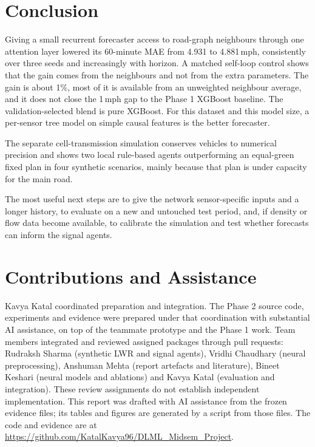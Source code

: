 \documentclass[conference]{IEEEtran}
\begin{document}
\section{Conclusion}
Giving a small recurrent forecaster access to road-graph neighbours through one attention layer lowered its 60-minute MAE from 4.931 to 4.881\,mph, consistently over three seeds and increasingly with horizon. A matched self-loop control shows that the gain comes from the neighbours and not from the extra parameters. The gain is about 1\%, most of it is available from an unweighted neighbour average, and it does not close the 1\,mph gap to the Phase 1 XGBoost baseline. The validation-selected blend is pure XGBoost. For this dataset and this model size, a per-sensor tree model on simple causal features is the better forecaster.

The separate cell-transmission simulation conserves vehicles to numerical precision and shows two local rule-based agents outperforming an equal-green fixed plan in four synthetic scenarios, mainly because that plan is under capacity for the main road.

The most useful next steps are to give the network sensor-specific inputs and a longer history, to evaluate on a new and untouched test period, and, if density or flow data become available, to calibrate the simulation and test whether forecasts can inform the signal agents.

\section*{Contributions and Assistance}
Kavya Katal coordinated preparation and integration. The Phase 2 source code, experiments and evidence were prepared under that coordination with substantial AI assistance, on top of the teammate prototype and the Phase 1 work. Team members integrated and reviewed assigned packages through pull requests: Rudraksh Sharma (synthetic LWR and signal agents), Vridhi Chaudhary (neural preprocessing), Anshuman Mehta (report artefacts and literature), Bineet Keshari (neural models and ablations) and Kavya Katal (evaluation and integration). These review assignments do not establish independent implementation. This report was drafted with AI assistance from the frozen evidence files; its tables and figures are generated by a script from those files. The code and evidence are at \url{https://github.com/KatalKavya96/DLML_Midsem_Project}.
\end{document}
